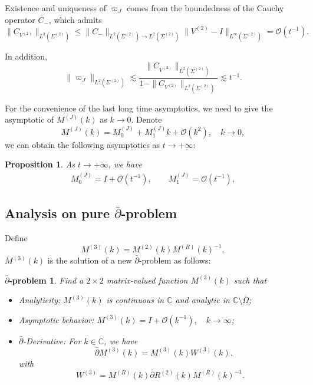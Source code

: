 \documentclass[11pt]{article}
\numberwithin{equation}{section}
\newtheorem{Proposition}{Proposition}
\newtheorem{dbar}{$\bar{\partial}$-problem}
\begin{document}
Existence and uniqueness of $\varpi_J$ comes from the boundedness of the Cauchy operator $C_{-}$, which admits
\begin{equation*}
\|C_{V^{(2)}}\|_{L^2(\Sigma^{(2)})} \leqslant \|C_{-}\|_{L^2(\Sigma^{(2)}) \to L^2(\Sigma^{(2)})} \|V^{(2)} - I\|_{L^\infty(\Sigma^{(2)})} = \mathcal{O}(t^{-1}).
\end{equation*}

In addition,
\begin{equation*}
    \|\varpi_J\|_{L^2(\Sigma^{(2)})} \lesssim \frac{\|C_{V^{(2)}}\|_{L^2(\Sigma^{(2)})}}{1 - \|C_{V^{(2)}}\|_{L^2(\Sigma^{(2)})}} \lesssim t^{-1}.
\end{equation*}

For the convenience of the last long time asymptotics, we need to give the asymptotic of $M^{(J)}(k)$ as $k\to0$. Denote
\begin{equation*}
    M^{(J)}(k)=M^{(J)}_0+M^{(J)}_1k+\mathcal{O}(k^2),\quad k\to0,
\end{equation*}
we can obtain the following asymptotics as $t\to+\infty$:

\begin{Proposition}\label{p33}
    As $t\to+\infty$, we have
    \begin{align}
     M^{(J)}_0=I+ \mathcal{O}(t^{-1}),\quad \quad M^{(J)}_1=\mathcal{O}(t^{-1}),
    \end{align}

\end{Proposition}


\subsection{Analysis on pure \texorpdfstring{$\bar{\partial}$}{\bar{\partial}}-problem}\label{sec5.3}

Define
\begin{equation}\label{eq74}
    M^{(3)}(k)=M^{(2)}(k)M^{(R)}(k)^{-1},
\end{equation}
$M^{(3)}(k)$ is the solution of a new $\bar{\partial}$-problem as follows:

\begin{dbar}\label{dbar3}
    Find a $2 \times 2$ matrix-valued function $M^{(3)}(k)$ such that
\begin{itemize}
    \item Analyticity: $M^{(3)}(k)$ is continuous in $\mathbb{C}$ and analytic in $\mathbb{C} \setminus \overline{\Omega}$;
    \item Asymptotic behavior: $M^{(3)}(k) = I + \mathcal{O}(k^{-1}), \quad k \to \infty$;
    \item $\bar{\partial}$-Derivative: For $k \in \mathbb{C}$, we have
    \begin{equation*}
        \quad \bar{\partial} M^{(3)}(k) = M^{(3)}(k) W^{(3)}(k),
    \end{equation*}
    with
    \begin{equation*}
        W^{(3)} = M^{(R)}(k) \bar{\partial} R^{(2)}(k) M^{(R)}(k)^{-1}.
    \end{equation*}
\end{itemize}
\end{dbar}
\end{document}
